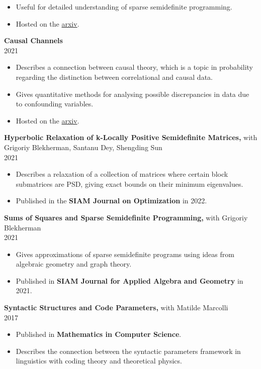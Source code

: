 \documentclass[margin]{res}
\begin{document}
\begin{resume}
\begin{itemize}
\item Useful for detailed understanding of sparse semidefinite programming.
\item Hosted on the \href{https://arxiv.org/abs/2106.13894}{arxiv}.
\end{itemize}
{\bf    Causal Channels} \\ 2021
\begin{itemize} \itemsep -2pt %
\item Describes a connection between causal theory, which is a topic in probability regarding the distinction between correlational and causal data.
\item Gives quantitative methods for analysing possible discrepancies in data due to confounding variables.
\item Hosted on the \href{https://arxiv.org/abs/2103.02834}{arxiv}.
\end{itemize}
{\bf    Hyperbolic Relaxation of k-Locally Positive Semidefinite Matrices,} with Grigoriy Blekherman, Santanu Dey, Shengding Sun\\ 2021
\begin{itemize} \itemsep -2pt %
\item Describes a relaxation of a collection of matrices where certain block submatrices are PSD, giving exact bounds on their minimum eigenvalues.
\item Published in the \textbf{SIAM Journal on Optimization} in 2022.
\end{itemize}
{\bf   Sums of Squares and Sparse Semidefinite Programming,} with Grigoriy Blekherman \\ 2021
\begin{itemize} \itemsep -2pt %
\item Gives approximations of sparse semidefinite programs using ideas from algebraic geometry and graph theory.
\item Published in \textbf{SIAM Journal for Applied Algebra and Geometry} in 2021.
\end{itemize}
{\bf  Syntactic Structures and Code Parameters,} with Matilde Marcolli \\ 2017
\begin{itemize} \itemsep -2pt %
\item Published in \textbf{Mathematics in Computer Science}.
\item Describes the connection between the syntactic parameters framework in linguistics with coding theory and theoretical physics.
\end{itemize}



\end{resume}
\end{document}
